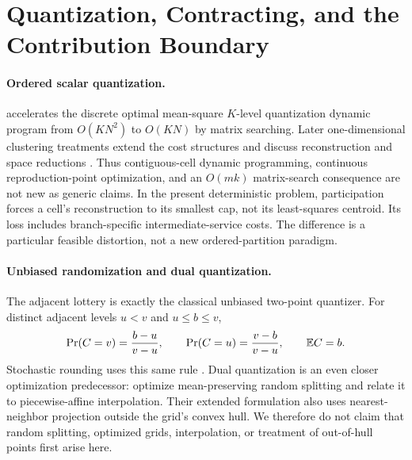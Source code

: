 \section{Quantization, Contracting, and the Contribution Boundary}\label{sec:r37-position}
\paragraph{Ordered scalar quantization.}
\citet{Wu1991} accelerates the discrete optimal mean-square $K$-level quantization dynamic program from $O(KN^2)$ to $O(KN)$ by matrix searching. Later one-dimensional clustering treatments extend the cost structures and discuss reconstruction and space reductions \citep{GronlundEtAl2017}. Thus contiguous-cell dynamic programming, continuous reproduction-point optimization, and an $O(mk)$ matrix-search consequence are not new as generic claims. In the present deterministic problem, participation forces a cell's reconstruction to its smallest cap, not its least-squares centroid. Its loss includes branch-specific intermediate-service costs. The difference is a particular feasible distortion, not a new ordered-partition paradigm.

\paragraph{Unbiased randomization and dual quantization.}
The adjacent lottery is exactly the classical unbiased two-point quantizer. For distinct adjacent levels $u<v$ and $u\leq b\leq v$,
\begin{equation}\label{eq:unbiased}
 \Pr(C=v)=\frac{b-u}{v-u},\qquad
 \Pr(C=u)=\frac{v-b}{v-u},\qquad \mathbb E C=b.
\end{equation}
Stochastic rounding uses this same rule \citep{CrociEtAl2022}. Dual quantization is an even closer optimization predecessor: \citet{PagesWilbertz2012} optimize mean-preserving random splitting and relate it to piecewise-affine interpolation. Their extended formulation also uses nearest-neighbor projection outside the grid's convex hull. We therefore do not claim that random splitting, optimized grids, interpolation, or treatment of out-of-hull points first arise here.

